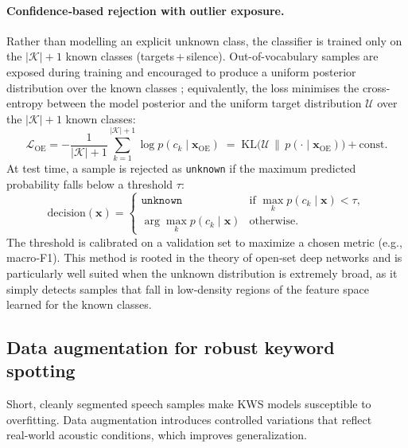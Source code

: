 \documentclass[11pt]{article}
\begin{document}
\paragraph{Confidence‑based rejection with outlier exposure.}
Rather than modelling an explicit unknown class, the classifier is trained only on the $|\mathcal{K}|+1$ known classes (targets + silence). 
Out-of-vocabulary samples are exposed during training and encouraged to produce a uniform posterior distribution over the known classes \cite{oe}; equivalently, the loss minimises the cross-entropy between the model posterior and the uniform target distribution $\mathcal{U}$ over the $|\mathcal{K}|+1$ known classes:
\begin{equation}
    \mathcal{L}_{\text{OE}} = -\frac{1}{|\mathcal{K}|+1} \sum_{k=1}^{|\mathcal{K}|+1} \log p(c_k \mid \mathbf{x}_{\text{OE}}) \;=\; \mathrm{KL}\bigl(\mathcal{U} \,\big\|\, p(\cdot \mid \mathbf{x}_{\text{OE}})\bigr) + \text{const}.
\end{equation}
At test time, a sample is rejected as \texttt{unknown} if the maximum predicted probability falls below a threshold $\tau$:
\begin{equation}
    \text{decision}(\mathbf{x}) = \begin{cases}
        \texttt{unknown} & \text{if } \max_k p(c_k \mid \mathbf{x}) < \tau,\\
        \arg\max_k p(c_k \mid \mathbf{x}) & \text{otherwise}.
    \end{cases}
\end{equation}
The threshold is calibrated on a validation set to maximize a chosen metric (e.g., macro‑F1). 
This method is rooted in the theory of open‑set deep networks \cite{openmax} and is particularly well suited when the unknown distribution is extremely broad, as it simply detects samples that fall in low‑density regions of the feature space learned for the known classes.

\subsection{Data augmentation for robust keyword spotting}
Short, cleanly segmented speech samples  make KWS models susceptible to overfitting. 
Data augmentation introduces controlled variations that reflect real‑world acoustic conditions, which improves generalization.
\end{document}
